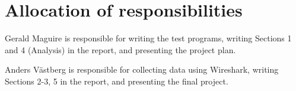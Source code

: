 \section{Allocation of responsibilities}
\label{sect:alloc_responsibilities}

Gerald Maguire is responsible for writing the test programs, writing Sections 1 and 4 (Analysis) in the report, and presenting the project plan.

Anders Västberg is responsible for collecting data using Wireshark, writing Sections 2-3, 5 in the report, and presenting the final project.

